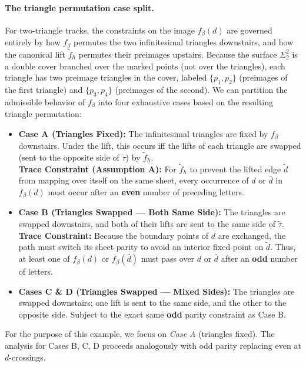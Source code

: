 \paragraph{The triangle permutation case split.}
For two-triangle tracks, the constraints on the image $f_\beta(d)$ are governed entirely by how $f_\beta$ permutes the two infinitesimal triangles downstairs, and how the canonical lift $\tilde{f}_h$ permutes their preimages upstairs. Because the surface $\Sigma_2^2$ is a double cover branched over the marked points (not over the triangles), each triangle has two preimage triangles in the cover, labeled $\{p_1, p_2\}$ (preimages of the first triangle) and $\{p_3, p_4\}$ (preimages of the second). We can partition the admissible behavior of $f_\beta$ into four exhaustive cases based on the resulting triangle permutation:
\begin{itemize}
    \item \textbf{Case A (Triangles Fixed):} The infinitesimal triangles are fixed by $f_\beta$ downstairs. Under the lift, this occurs iff the lifts of each triangle are swapped (sent to the opposite side of $\tilde{\tau}$) by $\tilde{f}_h$.\\
    \textbf{Trace Constraint (Assumption A):} For $\tilde{f}_h$ to prevent the lifted edge $\tilde{d}$ from mapping over itself on the same sheet, every occurrence of $d$ or $\bar{d}$ in $f_\beta(d)$ must occur after an \textbf{even} number of preceding letters.

    \item \textbf{Case B (Triangles Swapped --- Both Same Side):} The triangles are swapped downstairs, and both of their lifts are sent to the same side of $\tilde{\tau}$.\\
    \textbf{Trace Constraint:} Because the boundary points of $d$ are exchanged, the path must switch its sheet parity to avoid an interior fixed point on $\tilde{d}$. Thus, at least one of $f_\beta(d)$ or $f_\beta(\bar{d})$ must pass over $d$ or $\bar{d}$ after an \textbf{odd} number of letters.

    \item \textbf{Cases C \& D (Triangles Swapped --- Mixed Sides):} The triangles are swapped downstairs; one lift is sent to the same side, and the other to the opposite side. Subject to the exact same \textbf{odd} parity constraint as Case B.
\end{itemize}
For the purpose of this example, we focus on \emph{Case A} (triangles fixed). The analysis for Cases B, C, D proceeds analogously with odd parity replacing even at $d$-crossings.

